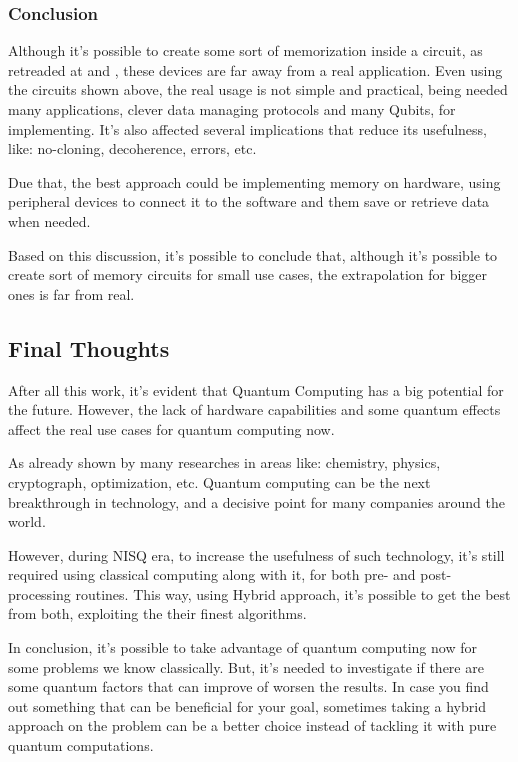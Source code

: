 \documentclass{article}
\begin{document}
\subsubsection{Conclusion}

Although it's possible to create some sort of memorization inside a circuit, as retreaded at \cite{jaques2023qram} and \cite{Giovannetti_2008}, these devices are far away from a real application. Even using the circuits shown above, the real usage is not simple and practical, being needed many applications, clever data managing protocols and many Qubits, for implementing. It's also affected several implications that reduce its usefulness, like: no-cloning, decoherence, errors, etc.

Due that, the best approach could be implementing memory on hardware, using peripheral devices to connect it to the software and them save or retrieve data when needed.

Based on this discussion, it's possible to conclude that, although it's possible to create sort of memory circuits for small use cases, the extrapolation for bigger ones is far from real. 

\subsection{Final Thoughts}

After all this work, it's evident that Quantum Computing has a big potential for the future. However, the lack of hardware capabilities and some quantum effects affect the real use cases for quantum computing now.

As already shown by many researches in areas like: chemistry, physics, cryptograph, optimization, etc. Quantum computing can be the next breakthrough in technology, and a decisive point for many companies around the world.

However, during NISQ era, to increase the usefulness of such technology, it's still required using classical computing along with it, for both pre- and post-processing routines. This way, using Hybrid approach, it's possible to get the best from both, exploiting the their finest algorithms.

In conclusion, it's possible to take advantage of quantum computing now for some problems we know classically. But, it's needed to investigate if there are some quantum factors that can improve of worsen the results. In case you find out something that can be beneficial for your goal, sometimes taking a hybrid approach on the problem can be a better choice instead of tackling it with pure quantum computations.
\end{document}
